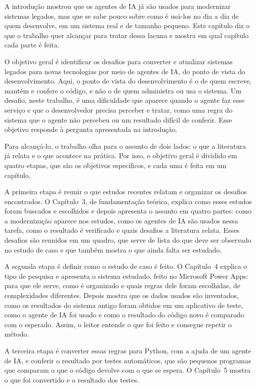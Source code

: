 A introdução mostrou que os agentes de IA já são usados para modernizar sistemas legados, mas que se sabe pouco sobre como é usá-los no dia a dia de quem desenvolve, em um sistema real e de tamanho pequeno. Este capítulo diz o que o trabalho quer alcançar para tratar dessa lacuna e mostra em qual capítulo cada parte é feita.

O objetivo geral é identificar os desafios para converter e atualizar sistemas legados para novas tecnologias por meio de agentes de IA, do ponto de vista do desenvolvimento. Aqui, o ponto de vista do desenvolvimento é o de quem escreve, mantém e confere o código, e não o de quem administra ou usa o sistema. Um desafio, neste trabalho, é uma dificuldade que aparece quando o agente faz esse serviço e que o desenvolvedor precisa perceber e tratar, como uma regra do sistema que o agente não percebeu ou um resultado difícil de conferir. Esse objetivo responde à pergunta apresentada na introdução.

Para alcançá-lo, o trabalho olha para o assunto de dois lados: o que a literatura já relata e o que acontece na prática. Por isso, o objetivo geral é dividido em quatro etapas, que são os objetivos específicos, e cada uma é feita em um capítulo.

A primeira etapa é reunir o que estudos recentes relatam e organizar os desafios encontrados. O Capítulo~3, de fundamentação teórica, explica como esses estudos foram buscados e escolhidos e depois apresenta o assunto em quatro partes: como a modernização aparece nos estudos, como os agentes de IA são usados nessa tarefa, como o resultado é verificado e quais desafios a literatura relata. Esses desafios são reunidos em um quadro, que serve de lista do que deve ser observado no estudo de caso e que também mostra o que ainda falta ser estudado.

A segunda etapa é definir como o estudo de caso é feito. O Capítulo~4 explica o tipo de pesquisa e apresenta o sistema estudado, feito no Microsoft Power Apps: para que ele serve, como é organizado e quais regras dele foram escolhidas, de complexidades diferentes. Depois mostra que os dados usados são inventados, como os resultados do sistema antigo foram obtidos em um aplicativo de teste, como o agente de IA foi usado e como o resultado do código novo é comparado com o esperado. Assim, o leitor entende o que foi feito e consegue repetir o método.

A terceira etapa é converter essas regras para Python, com a ajuda de um agente de IA, e conferir o resultado por testes automáticos, que são pequenos programas que comparam o que o código devolve com o que se espera. O Capítulo~5 mostra o que foi convertido e o resultado dos testes.

